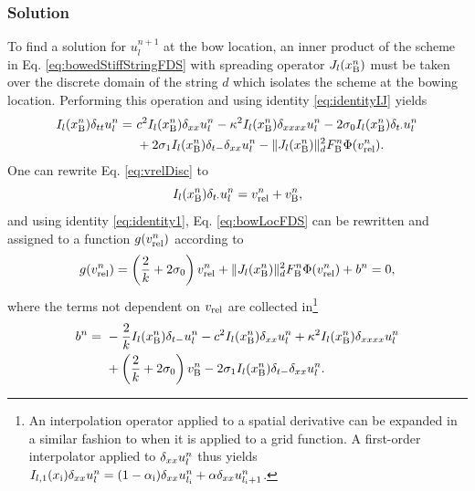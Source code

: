 \subsubsection{Solution}
To find a solution for $u_l^{n+1}$ at the bow location, an inner product of the scheme in Eq. \eqref{eq:bowedStiffStringFDS} with spreading operator $J_l(x_{\text{B}}^n)$ must be taken over the discrete domain of the string $d$ which isolates the scheme at the bowing location. Performing this operation and using identity \eqref{eq:identityIJ} yields
\begin{equation}\label{eq:bowLocFDS}
    \begin{aligned}
    I_l(x_{\text{B}}^n)\delta_{tt}u_l^n =\ &c^2 I_l(x_{\text{B}}^n)\delta_{xx} u_l^n - \kappa^2 I_l(x_{\text{B}}^n)\delta_{xxxx} u_l^n- 2 \sigma_{0} I_l(x_{\text{B}}^n)\delta_{t\cdot} u_l^n\\
    & + 2 \sigma_{1} I_l(x_{\text{B}}^n)\delta_{t-}\delta_{xx} u_l^n - \lVert J_l(x_{\text{B}}^n)\rVert^2_d F_{\text{B}}^n\Phi(v_\text{rel}^n).
    \end{aligned}
\end{equation}
One can rewrite Eq. \eqref{eq:vrelDisc} to 
\begin{equation}\label{eq:vrelRewritten}
   I_l(x_{\text{B}}^n)\delta_{t\cdot} u_l^n =  v_\text{rel}^n + v_{\text{B}}^n,
\end{equation}
and using identity \eqref{eq:identity1}, Eq. \eqref{eq:bowLocFDS} can be rewritten and assigned to a function $g(v_\text{rel}^n)$ according to
\begin{equation}\label{eq:staticFrictionNRfunc}
    g(v_\text{rel}^n) = \left(\frac{2}{k} + 2\sigma_{0}\right)v_\text{rel}^n + \lVert J_l(x_{\text{B}}^n)\rVert^2_d F_{\text{B}}^n\Phi(v_\text{rel}^n) + b^n = 0,
\end{equation}
where the terms not dependent on $v_\text{rel}$ are collected in\footnote{An interpolation operator applied to a spatial derivative can be expanded in a similar fashion to when it is applied to a grid function. A first-order interpolator applied to $\delta_{xx} u_l^n$ thus yields $I_{l,1}(x_{\text{i}}) \delta_{xx} u_l^n = (1-\alpha_{\text{i}})\delta_{xx} u_{l_{\text{i}}}^n + \alpha \delta_{xx} u_{l_{\text{i}}+1}^n$.}
\begin{equation}\label{eq:staticbDef}
    \begin{aligned}
        b^n =\ &-\frac{2}{k}I_l(x_{\text{B}}^n)\delta_{t-} u_l^n-c^2 I_l(x_{\text{B}}^n)\delta_{xx} u_l^n + \kappa^2 I_l(x_{\text{B}}^n)\delta_{xxxx} u_l^n \\
        &+ \left( \frac{2}{k} + 2 \sigma_{0} \right)v_{\text{B}}^n - 2 \sigma_{1} I_l(x_{\text{B}}^n)\delta_{t-}\delta_{xx} u_l^n.
    \end{aligned}
\end{equation}
%

